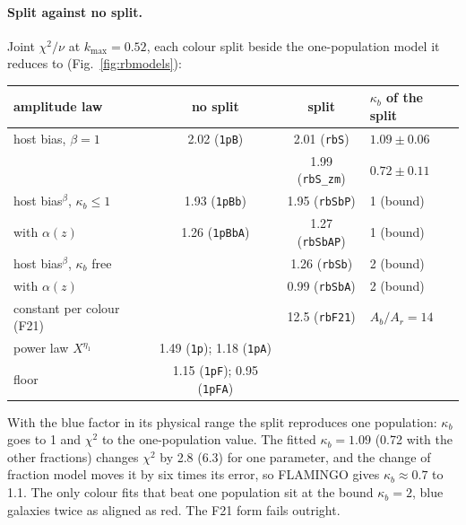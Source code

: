 \documentclass[11pt]{article}
\newcommand{\kmax}{k_{\max}}
\begin{document}
\paragraph{Split against no split.} Joint $\chi^2/\nu$ at $\kmax = 0.52$,
each colour split beside the one-population model it reduces to
(Fig.~\ref{fig:rbmodels}):
\begin{center}\small
\begin{tabular}{lccl}\toprule
amplitude law & no split & split & $\kappa_b$ of the split\\ \midrule
host bias, $\beta = 1$ & 2.02 (\texttt{1pB}) & 2.01 (\texttt{rbS}) & $1.09 \pm 0.06$\\
 & & 1.99 (\texttt{rbS\_zm}) & $0.72 \pm 0.11$\\
host bias$^\beta$, $\kappa_b \le 1$ & 1.93 (\texttt{1pBb}) & 1.95 (\texttt{rbSbP}) & 1 (bound)\\
\quad with $\alpha(z)$ & 1.26 (\texttt{1pBbA}) & 1.27 (\texttt{rbSbAP}) & 1 (bound)\\
host bias$^\beta$, $\kappa_b$ free & & 1.26 (\texttt{rbSb}) & 2 (bound)\\
\quad with $\alpha(z)$ & & 0.99 (\texttt{rbSbA}) & 2 (bound)\\
constant per colour (F21) & & 12.5 (\texttt{rbF21}) & $A_b/A_r = 14$\\ \midrule
power law $X^{\eta_1}$ & 1.49 (\texttt{1p}); 1.18 (\texttt{1pA}) & & \\
floor & 1.15 (\texttt{1pF}); 0.95 (\texttt{1pFA}) & & \\
\bottomrule\end{tabular}
\end{center}
With the blue factor in its physical range the split reproduces one
population: $\kappa_b$ goes to 1 and $\chi^2$ to the one-population value.
The fitted $\kappa_b = 1.09$ (0.72 with the other fractions) changes $\chi^2$
by 2.8 (6.3) for one parameter, and the change of fraction model moves it by
six times its error, so FLAMINGO gives $\kappa_b \approx 0.7$ to 1.1. The only
colour fits that beat one population sit at the bound $\kappa_b = 2$, blue
galaxies twice as aligned as red. The F21 form fails outright.
\end{document}
